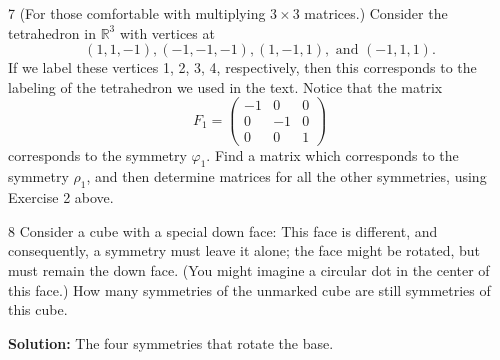 \begin{problem}{7}
    (For those comfortable with multiplying $3 \times 3$ matrices.) Consider the
    tetrahedron in $\mathbb{R}^3$ with vertices at
    \[(1, 1, -1), (-1, -1, -1), (1, -1, 1), \text{ and } (-1, 1, 1).\]
    If we label these vertices 1, 2, 3, 4, respectively, then this corresponds to the
    labeling of the tetrahedron we used in the text. Notice that the matrix
    \[F_1 = \begin{pmatrix} -1 & 0 & 0 \\ 0 & -1 & 0 \\ 0 & 0 & 1 \end{pmatrix}\]
    corresponds to the symmetry $\varphi_1$. Find a matrix which corresponds to the
    symmetry $\rho_1$, and then determine matrices for all the other symmetries, using
    Exercise 2 above.
\end{problem}
\unsolved

\begin{problem}{8}
    Consider a cube with a special down face: This face is 
    different, and consequently, a symmetry must leave it alone; the 
    face might be rotated, but must remain the down face.
    (You might imagine a circular dot in the center of this face.)
    How many symmetries of the unmarked cube are still symmetries 
    of this cube.
\end{problem}
\solved

\textbf{Solution:} The four symmetries that rotate the base.
